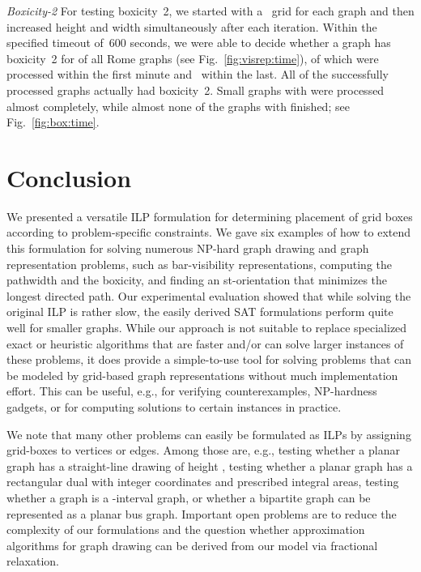 \documentclass[runningheads]{llncs}
\newcounter{constr}
\begin{document}
\smallskip\noindent\textit{Boxicity-2}
For testing boxicity~2,
we started with a~ grid for each graph 
and then increased height and width simultaneously after each iteration.
Within the specified timeout of~600 seconds,
we were able to decide whether a graph has boxicity~2
for  of all Rome graphs (see Fig.~\ref{fig:visrep:time}),
 of which were processed within the first minute and~
within the last.
All of the successfully processed graphs actually had boxicity~2.
Small graphs with  were processed almost completely,
while almost none of the graphs with  finished;
see Fig.~\ref{fig:box:time}. 
\section{Conclusion}
We presented a versatile ILP formulation for determining placement of
grid boxes according to problem-specific constraints. We gave six
examples of how to extend this formulation for solving numerous
NP-hard graph drawing and graph representation problems, such as
bar-visibility representations, computing the pathwidth and the
boxicity, and finding an st-orientation that minimizes the
longest directed path. Our experimental evaluation showed that while solving the original ILP is rather slow, the easily derived SAT formulations perform quite well for smaller graphs. While our approach is not suitable to replace specialized exact or heuristic algorithms that are faster and/or can solve larger instances of these problems, it does provide a simple-to-use tool for solving problems that can be modeled by grid-based graph representations without much implementation effort. This can be useful, e.g., for verifying counterexamples, NP-hardness gadgets, or for computing solutions to certain instances in practice.

We note that many other problems can easily be formulated as ILPs by assigning
grid-boxes to vertices or edges.  Among those are, e.g., testing
whether a planar graph has a straight-line drawing of height ,
testing whether a planar graph has a rectangular dual with
integer coordinates and prescribed integral areas, testing whether a graph is a -interval graph, or whether a  bipartite graph can be represented as a planar bus graph. 
Important open problems are to reduce the complexity of our formulations and the question whether approximation algorithms for graph drawing can be derived from our model via fractional relaxation. 


{\small
  
  
}
\end{document}
